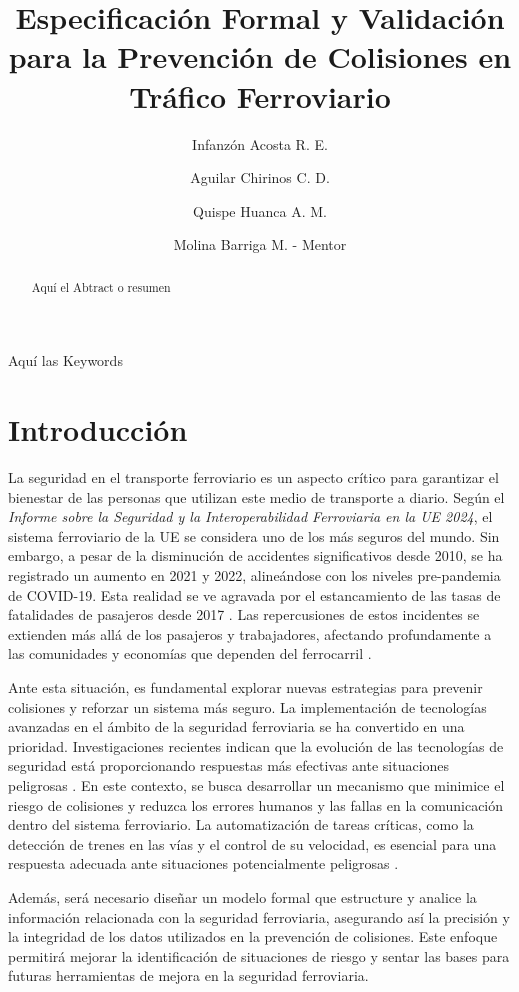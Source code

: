 \documentclass[journal]{IEEEtran}
\title{Especificación Formal y Validación para la Prevención de Colisiones en Tráfico Ferroviario}
\author[1]{Infanzón Acosta R. E.}
\author[1]{Aguilar Chirinos C. D.}
\author[1]{Quispe Huanca A. M.}
\affil{Universidad La Salle, Arequipa, Perú}
\author[2]{Molina Barriga M. - Mentor }
\begin{document}
 

\maketitle

\begin{abstract}
Aquí el Abtract o resumen
\end{abstract}

\begin{IEEEkeywords}
Aquí las Keywords
\end{IEEEkeywords}

\section{Introducción}  
La seguridad en el transporte ferroviario es un aspecto crítico para garantizar el bienestar de las personas que utilizan este medio de transporte a diario. Según el \textit{Informe sobre la Seguridad y la Interoperabilidad Ferroviaria en la UE 2024}, el sistema ferroviario de la UE se considera uno de los más seguros del mundo. Sin embargo, a pesar de la disminución de accidentes significativos desde 2010, se ha registrado un aumento en 2021 y 2022, alineándose con los niveles pre-pandemia de COVID-19. Esta realidad se ve agravada por el estancamiento de las tasas de fatalidades de pasajeros desde 2017 \cite{eu2024}. Las repercusiones de estos incidentes se extienden más allá de los pasajeros y trabajadores, afectando profundamente a las comunidades y economías que dependen del ferrocarril \cite{carrington2019}.  

Ante esta situación, es fundamental explorar nuevas estrategias para prevenir colisiones y reforzar un sistema más seguro. La implementación de tecnologías avanzadas en el ámbito de la seguridad ferroviaria se ha convertido en una prioridad. Investigaciones recientes indican que la evolución de las tecnologías de seguridad está proporcionando respuestas más efectivas ante situaciones peligrosas \cite{holland2021}. En este contexto, se busca desarrollar un mecanismo que minimice el riesgo de colisiones y reduzca los errores humanos y las fallas en la comunicación dentro del sistema ferroviario. La automatización de tareas críticas, como la detección de trenes en las vías y el control de su velocidad, es esencial para una respuesta adecuada ante situaciones potencialmente peligrosas \cite{automation2020}.  

Además, será necesario diseñar un modelo formal que estructure y analice la información relacionada con la seguridad ferroviaria, asegurando así la precisión y la integridad de los datos utilizados en la prevención de colisiones. Este enfoque permitirá mejorar la identificación de situaciones de riesgo y sentar las bases para futuras herramientas de mejora en la seguridad ferroviaria.  
\end{document}
